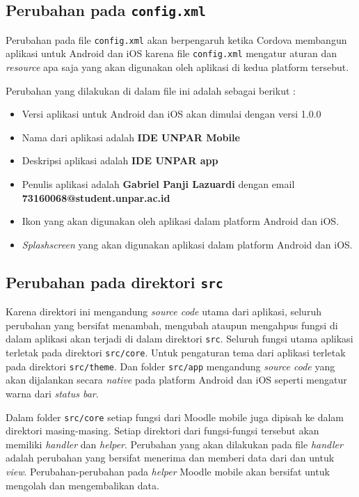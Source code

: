 \subsection{Perubahan pada \texttt{config.xml}}
Perubahan pada file \texttt{config.xml} akan berpengaruh ketika Cordova membangun aplikasi untuk Android dan iOS karena file \texttt{config.xml} mengatur aturan dan \textit{resource} apa saja yang akan digunakan oleh aplikasi di kedua platform tersebut. 

Perubahan yang dilakukan di dalam file ini adalah sebagai berikut : 

\begin{itemize}
\item Versi aplikasi untuk Android dan iOS akan dimulai dengan versi 1.0.0
\item Nama dari aplikasi adalah \textbf{IDE UNPAR Mobile}
\item Deskripsi aplikasi adalah \textbf{IDE UNPAR app}
\item Penulis aplikasi adalah \textbf{Gabriel Panji Lazuardi} dengan email \textbf{73160068@student.unpar.ac.id}
\item Ikon yang akan digunakan oleh aplikasi dalam platform Android dan iOS.
\item \textit{Splashscreen} yang akan digunakan aplikasi dalam platform Android dan iOS.
\end{itemize}  

\subsection{Perubahan pada direktori \texttt{src}}

Karena direktori ini mengandung \textit{source code} utama dari aplikasi, seluruh perubahan yang bersifat menambah, mengubah ataupun mengahpus fungsi di dalam aplikasi akan terjadi di dalam direktori \texttt{src}. Seluruh fungsi utama aplikasi terletak pada direktori \texttt{src/core}. Untuk pengaturan tema dari aplikasi terletak pada direktori \texttt{src/theme}. Dan folder \texttt{src/app} mengandung \textit{source code} yang akan dijalankan secara \textit{native} pada platform Android dan iOS seperti mengatur warna dari \textit{status bar}.	

Dalam folder \texttt{src/core} setiap fungsi dari Moodle mobile juga dipisah ke dalam direktori masing-masing. Setiap direktori dari fungsi-fungsi tersebut akan memiliki \textit{handler} dan \textit{helper}. Perubahan yang akan dilakukan pada file \textit{handler} adalah perubahan yang bersifat menerima dan memberi data dari dan untuk \textit{view}. Perubahan-perubahan pada \textit{helper} Moodle mobile akan bersifat untuk mengolah dan mengembalikan data.

